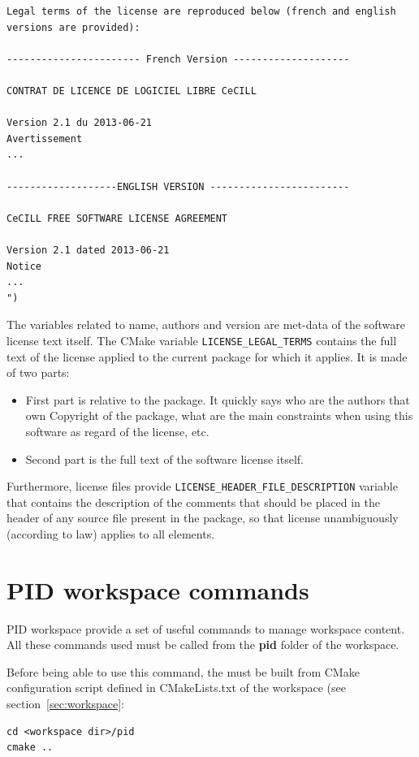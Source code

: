 \documentclass[12pt,a4paper]{article}
\begin{document}
\begin{verbatim}
Legal terms of the license are reproduced below (french and english versions are provided):

----------------------- French Version --------------------

CONTRAT DE LICENCE DE LOGICIEL LIBRE CeCILL

Version 2.1 du 2013-06-21
Avertissement
...

-------------------ENGLISH VERSION ------------------------

CeCILL FREE SOFTWARE LICENSE AGREEMENT

Version 2.1 dated 2013-06-21
Notice
...
")
\end{verbatim}

The variables related to name, authors and version are met-data of the software license text itself. The CMake variable \texttt{LICENSE\_LEGAL\_TERMS} contains the full text of the license applied to the current package for which it applies. It is made of two parts:
\begin{itemize}
\item First part is relative to the package. It quickly says who are the authors that own Copyright of the package, what are the main constraints when using this software as regard of the license, etc.
\item Second part is the full text of the software license itself. 
\end{itemize}

Furthermore, license files provide \texttt{LICENSE\_HEADER\_FILE\_DESCRIPTION} variable that contains the description of the comments that should be placed in the header of any source file present in the package, so that license unambiguously (according to law) applies to all elements.

\pagebreak

\section{PID workspace commands}
\label{sec:PIDCMakeWorkspaceCommands}

PID workspace provide a set of useful commands to manage workspace content. All these commands used must be called from the \textbf{pid} folder of the workspace.

Before being able to use this command, the must be built from CMake configuration script defined in CMakeLists.txt of the workspace (see section~\ref{sec:workspace}:
\begin{verbatim}
cd <workspace dir>/pid
cmake ..
\end{verbatim}
\end{document}
